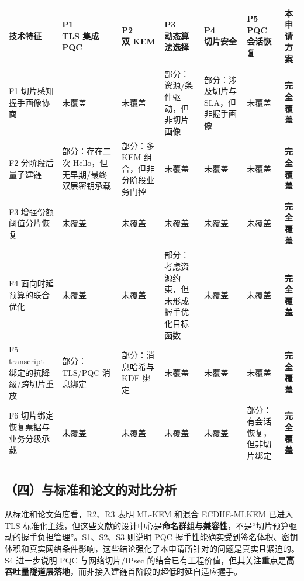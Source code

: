 \documentclass[12pt,a4paper]{article}
\begin{document}
\begingroup
{}
\small
\renewcommand{\arraystretch}{1.2}
\begin{longtable}{|p{1.7cm}|p{1.7cm}|p{1.7cm}|p{1.7cm}|p{1.7cm}|p{1.7cm}|p{1.7cm}|}
\hline
\textbf{技术特征} & \shortstack{\textbf{P1}\\\textbf{TLS 集成}\\\textbf{PQC}} & \shortstack{\textbf{P2}\\\textbf{双 KEM}} & \shortstack{\textbf{P3}\\\textbf{动态算法选择}} & \shortstack{\textbf{P4}\\\textbf{切片安全}} & \shortstack{\textbf{P5}\\\textbf{PQC 会话恢复}} & \shortstack{\textbf{本申请}\\\textbf{方案}} \\
\hline
F1 切片感知握手画像协商 & 未覆盖 & 未覆盖 & 部分：资源/条件驱动，但非切片画像 & 部分：涉及切片与 SLA，但非握手画像 & 未覆盖 & \textbf{完全覆盖} \\
\hline
F2 分阶段后量子建链 & 部分：存在二次 Hello，但无早期/最终双层密钥承载 & 部分：多 KEM 组合，但非分阶段业务门控 & 未覆盖 & 未覆盖 & 未覆盖 & \textbf{完全覆盖} \\
\hline
F3 增强份额阈值分片恢复 & 未覆盖 & 未覆盖 & 未覆盖 & 未覆盖 & 未覆盖 & \textbf{完全覆盖} \\
\hline
F4 面向时延预算的联合优化 & 未覆盖 & 未覆盖 & 部分：考虑资源约束，但未形成握手优化目标函数 & 未覆盖 & 未覆盖 & \textbf{完全覆盖} \\
\hline
F5 transcript 绑定的抗降级/跨切片重放 & 部分：TLS/PQC 消息绑定 & 部分：消息哈希与 KDF 绑定 & 未覆盖 & 未覆盖 & 未覆盖 & \textbf{完全覆盖} \\
\hline
F6 切片绑定恢复票据与业务分级承载 & 未覆盖 & 未覆盖 & 未覆盖 & 未覆盖 & 部分：有会话恢复，但非切片绑定 & \textbf{完全覆盖} \\
\hline
\end{longtable}
\endgroup

\subsection*{（四）与标准和论文的对比分析}

从标准和论文角度看，R2、R3 表明 ML-KEM 和混合 ECDHE-MLKEM 已进入 TLS 标准化主线，但这些文献的设计中心是\textbf{命名群组与兼容性}，不是“切片预算驱动的握手负担管理”。S1、S2、S3 则说明 PQC 握手性能确实受到签名体积、密钥体积和真实网络条件影响，这些结论强化了本申请所针对的问题是真实且紧迫的。S4 进一步说明 PQC 与网络切片/IPsec 的结合已有工程价值，但其关注重点是\textbf{高吞吐量隧道层落地}，而非接入建链首阶段的超低时延自适应握手。
\end{document}
